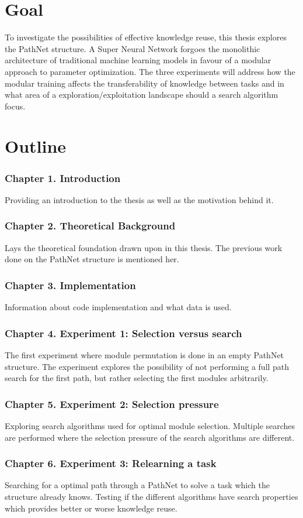 \section{Goal}
To investigate the possibilities of effective knowledge reuse, this thesis explores the PathNet structure. A Super Neural Network forgoes the monolithic architecture of traditional machine learning models in favour of a modular approach to parameter optimization. The three experiments will address how the modular training affects the transferability of knowledge between tasks and in what area of a exploration/exploitation landscape should a search algorithm focus.

\section{Outline}
\subsubsection{Chapter 1. Introduction}
Providing an introduction to the thesis as well as the motivation behind it.
\subsubsection{Chapter 2. Theoretical Background}
Lays the theoretical foundation drawn upon in this thesis. The previous work done on the PathNet structure is mentioned her.
\subsubsection{Chapter 3. Implementation}
Information about code implementation and what data is used.
\subsubsection{Chapter 4. Experiment 1: Selection versus search}
The first experiment where module permutation is done in an empty PathNet structure. The experiment explores the possibility of not performing a full path search for the first path, but rather selecting the first modules arbitrarily.
\subsubsection{Chapter 5. Experiment 2: Selection pressure}
Exploring search algorithms used for optimal module selection. Multiple searches are performed where the selection pressure of the search algorithms are different. 
\subsubsection{Chapter 6. Experiment 3: Relearning a task}
Searching for a optimal path through a PathNet to solve a task which the structure already knows. Testing if the different algorithms have search properties which provides better or worse knowledge reuse.
